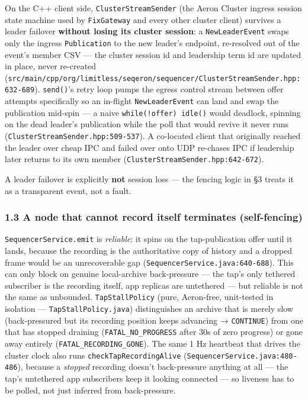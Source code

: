 \documentclass[
  10pt,
]{article}
\begin{document}
On the C++ client side, \texttt{ClusterStreamSender} (the Aeron Cluster
ingress session state machine used by \texttt{FixGateway} and every
other cluster client) survives a leader failover \textbf{without losing
its cluster session}: a \texttt{NewLeaderEvent} swaps only the ingress
\texttt{Publication} to the new leader's endpoint, re-resolved out of
the event's member CSV --- the cluster session id and leadership term id
are updated in place, never re-created
(\texttt{src/main/cpp/org/limitless/seqeron/sequencer/ClusterStreamSender.hpp:632-689}).
\texttt{send()}'s retry loop pumps the egress control stream between
offer attempts specifically so an in-flight \texttt{NewLeaderEvent} can
land and swap the publication mid-spin --- a naive
\texttt{while(!offer)\ idle()} would deadlock, spinning on the dead
leader's publication while the poll that would revive it never runs
(\texttt{ClusterStreamSender.hpp:509-537}). A co-located client that
originally reached the leader over cheap IPC and failed over onto UDP
re-chases IPC if leadership later returns to its own member
(\texttt{ClusterStreamSender.hpp:642-672}).

A leader failover is explicitly \textbf{not} session loss --- the
fencing logic in §3 treats it as a transparent event, not a fault.

\subsubsection{1.3 A node that cannot record itself terminates
(self-fencing)}\label{a-node-that-cannot-record-itself-terminates-self-fencing}

\texttt{SequencerService.emit} is \emph{reliable}: it spins on the
tap-publication offer until it lands, because the recording is the
authoritative copy of history and a dropped frame would be an
unrecoverable gap (\texttt{SequencerService.java:640-688}). This can
only block on genuine local-archive back-pressure --- the tap's only
tethered subscriber is the recording itself, app replicas are untethered
--- but reliable is not the same as unbounded. \texttt{TapStallPolicy}
(pure, Aeron-free, unit-tested in isolation ---
\texttt{TapStallPolicy.java}) distinguishes an archive that is merely
slow (back-pressured but its recording position keeps advancing →
\texttt{CONTINUE}) from one that has stopped draining
(\texttt{FATAL\_NO\_PROGRESS} after 30s of zero progress) or gone away
entirely (\texttt{FATAL\_RECORDING\_GONE}). The same 1 Hz heartbeat that
drives the cluster clock also runs \texttt{checkTapRecordingAlive}
(\texttt{SequencerService.java:480-486}), because a \emph{stopped}
recording doesn't back-pressure anything at all --- the tap's untethered
app subscribers keep it looking connected --- so liveness has to be
polled, not just inferred from back-pressure.
\end{document}
